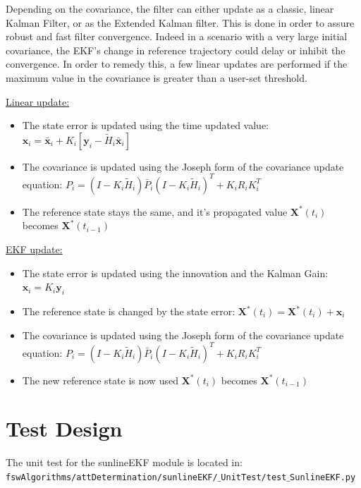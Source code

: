 \documentclass[]{BasiliskReportMemo}
\begin{document}
Depending on the covariance, the filter can either update as a classic, linear Kalman Filter, or as the Extended Kalman filter.
This is done in order to assure robust and fast filter convergence. Indeed in a scenario with a very large initial covariance, the EKF's
change in reference trajectory could delay or inhibit the convergence. In order to remedy this, a few linear updates are performed if the 
maximum value in the covariance is greater than a user-set threshold.

\underline{Linear update:}

\begin{itemize}
\item The state error is updated using the time updated value: $\bm x_i =  \bm \bar{x}_i + K_i\left[\bm y_i - \tilde{H}_i \bm \bar{x}_i \right]$
\item The covariance is updated using the Joseph form of the covariance update equation:
$P_i = \left( I - K_i \tilde{H}_i\right) \bar{P}_{i} \left( I - K_i \tilde{H}_i\right)^T + K_i R_i K_i^T$
\item The reference state stays the same, and it's propagated value $\bm X^*(t_i)$ becomes $\bm X^*(t_{i-1})$
\end{itemize}

 \underline{EKF update:}

\begin{itemize}
\item The state error is updated using the innovation and the Kalman Gain: $\bm x_i =   K_i\bm y_i $
\item The reference state is changed by the state error: $\bm X^*(t_i) =  \bm X^*(t_i) + \bm x_i $
\item The covariance is updated using the Joseph form of the covariance update equation:
$P_i = \left( I - K_i \tilde{H}_i\right) \bar{P}_{i} \left( I - K_i \tilde{H}_i\right)^T + K_i R_i K_i^T$
\item The new reference state is now used $\bm X^*(t_i)$ becomes $\bm X^*(t_{i-1})$
\end{itemize}

 


\section{Test Design}
The unit test for the sunlineEKF module is located in:\\

\noindent
{\tt fswAlgorithms/attDetermination/sunlineEKF/$\_$UnitTest/test$\_$SunlineEKF.py} \\
\end{document}

